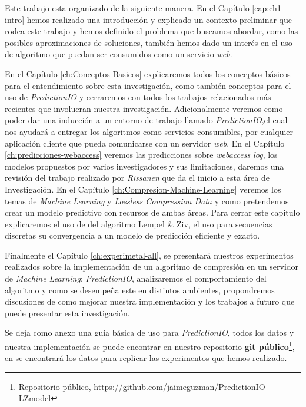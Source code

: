
Este trabajo esta organizado de la siguiente manera. En el Capítulo \ref{cap:ch1-intro} hemos realizado una introducción y  explicado un contexto preliminar que rodea este trabajo y hemos definido el problema que buscamos abordar, como las posibles aproximaciones de soluciones, también hemos dado un interés en el uso de algoritmo que puedan ser consumidos como un servicio \emph{web}.

En el Capítulo \ref{ch:Conceptos-Basicos} explicaremos todos los conceptos básicos para el entendimiento sobre esta investigación, como también conceptos para el uso de \emph{PredictionIO} y cerraremos con todos los trabajos relacionados más recientes que involucran nuestra investigación. Adicionalmente veremos como poder dar una inducción a un entorno de trabajo llamado \emph{PredictionIO},el cual nos ayudará a entregar los algoritmos como servicios consumibles, por cualquier aplicación cliente que pueda comunicarse con un servidor \emph{web}. En el Capítulo \ref{ch:predicciones-webaccess} veremos las predicciones sobre \emph{webaccess log}, los modelos propuestos por varios investigadores y sus limitaciones, daremos una revisión del trabajo realizado por \emph{Rissanen}\cite{Rissanen1984} que da el inicio a esta área de Investigación.
En el Capítulo \ref{ch:Compresion-Machine-Learning} veremos los temas de \emph{Machine Learning} y \emph{Lossless Compression Data} y como pretendemos crear un modelo predictivo con recursos de ambas áreas. Para cerrar este capitulo explicaremos el uso de del algoritmo Lempel \& Ziv, el uso para secuencias discretas su convergencia a un modelo de predicción eficiente y exacto. 

Finalmente el Capítulo \ref{ch:experimetal-all}, se presentará nuestros experimentos realizados sobre la implementación de un algoritmo de compresión en un servidor de \emph{Machine Learning}: \emph{PredictionIO}, analizaremos el comportamiento del algoritmo y como se desempeña este en distintos ambientes, propondremos discusiones de como mejorar nuestra implementación y los trabajos a futuro que puede presentar esta investigación.

Se deja como anexo una guía básica de uso para \emph{PredictionIO}, todos los datos y nuestra implementación se puede encontrar en nuestro repositorio \textbf{git público}\footnote{Repositorio público, \url{https://github.com/jaimeguzman/PredictionIO-LZmodel}}, en se encontrará  los datos para replicar las experimentos que hemos realizado. 
